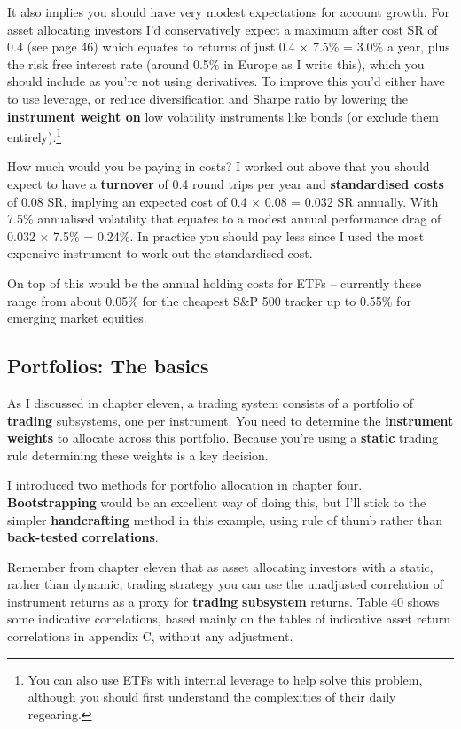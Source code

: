 It also implies you should have very modest expectations for account growth. For asset allocating investors I'd conservatively expect a maximum after cost SR of 0.4 (see page 46) which equates to returns of just 0.4 × 7.5\% = 3.0\% a year, plus the risk free interest rate (around 0.5\% in Europe as I write this), which you should include as you're not using derivatives. To improve this you'd either have to use leverage, or reduce diversification and Sharpe ratio by lowering the \textbf{instrument weight on} low volatility instruments like bonds (or exclude them entirely).\footnote{You can also use ETFs with internal leverage to help solve this problem, although you should first understand the complexities of their daily regearing.}

How much would you be paying in costs? I worked out above that you should expect to have a \textbf{turnover} of 0.4 round trips per year and \textbf{standardised costs} of 0.08 SR, implying an expected cost of 0.4 × 0.08 = 0.032 SR annually. With 7.5\% annualised volatility that equates to a modest annual performance drag of 0.032 × 7.5\% = 0.24\%. In practice you should pay less since I used the most expensive instrument to work out the standardised cost.

On top of this would be the annual holding costs for ETFs -- currently these range from about 0.05\% for the cheapest S\&P 500 tracker up to 0.55\% for emerging market equities.

\subsection*{Portfolios: The basics}

As I discussed in chapter eleven, a trading system consists of a portfolio of \textbf{trading} subsystems, one per instrument. You need to determine the \textbf{instrument weights} to allocate across this portfolio. Because you're using a \textbf{static} trading rule determining these weights is a key decision.

I introduced two methods for portfolio allocation in chapter four. \textbf{Bootstrapping} would be an excellent way of doing this, but I'll stick to the simpler \textbf{handcrafting} method in this example, using rule of thumb rather than \textbf{back-tested} \textbf{correlations}.

Remember from chapter eleven that as asset allocating investors with a static, rather than dynamic, trading strategy you can use the unadjusted correlation of instrument returns as a proxy for \textbf{trading} \textbf{subsystem} returns. Table 40 shows some indicative correlations, based mainly on the tables of indicative asset return correlations in appendix C, without any adjustment.

